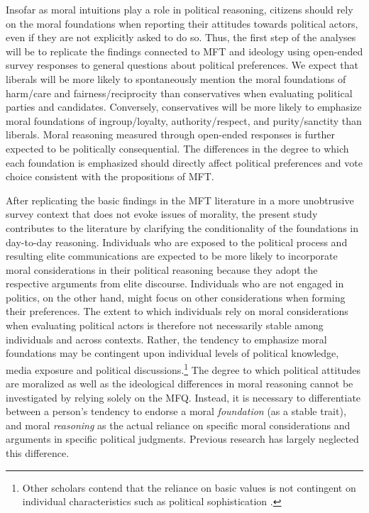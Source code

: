 \documentclass[12pt]{article}
\begin{document}
Insofar as moral intuitions play a role in political reasoning, citizens should rely on the moral foundations when reporting their attitudes towards political actors, even if they are not explicitly asked to do so. Thus, the first step of the analyses will be to replicate the findings connected to MFT and ideology using open-ended survey responses to general questions about political preferences. We expect that liberals will be more likely to spontaneously mention the moral foundations of harm/care and fairness/reciprocity than conservatives when evaluating political parties and candidates. Conversely, conservatives will be more likely to emphasize moral foundations of ingroup/loyalty, authority/respect, and purity/sanctity than liberals. Moral reasoning measured through open-ended responses is further expected to be politically consequential. The differences in the degree to which each foundation is emphasized should directly affect political preferences and vote choice consistent with the propositions of MFT.

After replicating the basic findings in the MFT literature in a more unobtrusive survey context that does not evoke issues of morality, the present study contributes to the literature by clarifying the conditionality of the foundations in day-to-day reasoning. Individuals who are exposed to the political process and resulting elite communications are expected to be more likely to incorporate moral considerations in their political reasoning because they adopt the respective arguments from elite discourse. Individuals who are not engaged in politics, on the other hand, might focus on other considerations when forming their preferences. The extent to which individuals rely on moral considerations when evaluating political actors is therefore not necessarily stable among individuals and across contexts. Rather, the tendency to emphasize moral foundations may be contingent upon individual levels of political knowledge, media exposure and political discussions.\footnote{Other scholars contend that the reliance on basic values is not contingent on individual characteristics such as political sophistication \citep[e.g.][]{feldman1992political,goren2001core,goren2004political,marietta2007values}.} The degree to which political attitudes are moralized as well as the ideological differences in moral reasoning cannot be investigated by relying solely on the MFQ. Instead, it is necessary to differentiate between a person's tendency to endorse a moral \textit{foundation} (as a stable trait), and moral \textit{reasoning} as the actual reliance on specific moral considerations and arguments in specific political judgments. Previous research has largely neglected this difference.
\end{document}

